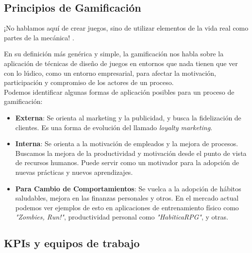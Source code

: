 \documentclass[journal]{IEEEtran}
\begin{document}
\subsection{\textbf{Principios de Gamificación}}

\begin{tcolorbox}[colback=gray!10, colframe=black, left=2mm, right=2mm]
    \small %
    \ttfamily %
    \raggedright %
    ¡No hablamos aquí de crear juegos, sino de utilizar elementos de la vida real como partes de la mecánica! \cite{nallar2015estructuraludica}.
\end{tcolorbox}

En su definición más genérica y simple, la gamificación nos habla sobre la aplicación de técnicas de diseño de juegos en entornos que nada tienen que ver con lo lúdico, como un entorno empresarial, para afectar la motivación, participación y compromiso de los actores de un proceso.
\\Podemos identificar algunas formas de aplicación posibles para un proceso de gamificación\cite[XVIII. Gamificación, fundamentos. Tipos de Gamificación.]{nallar2015estructuraludica}:
\begin{itemize}
    \item \textbf{Externa}: Se orienta al marketing y la publicidad, y busca la fidelización de clientes. Es una forma de evolución del llamado \textit{loyalty marketing}.
    \item \textbf{Interna}: Se orienta a la motivación de empleados y la mejora de procesos. Buscamos la mejora de la productividad y motivación desde el punto de vista de recursos humanos. Puede servir como un motivador para la adopción de nuevas prácticas y nuevos aprendizajes.
    \item \textbf{Para Cambio de Comportamientos}: Se vuelca a la adopción de hábitos saludables, mejora en las finanzas personales y otros. En el mercado actual podemos ver ejemplos de esto en aplicaciones de entrenamiento físico como \textit{"Zombies, Run!"}, productividad personal como \textit{"HabiticaRPG"}, y otras.
\end{itemize}

\subsection{\textbf{KPIs y equipos de trabajo}}
\end{document}
